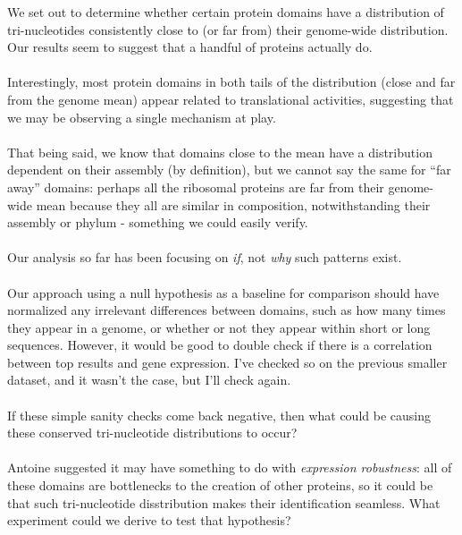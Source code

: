 \documentclass[12pt]{article}
\begin{document}
We set out to determine whether certain protein domains have a distribution of tri-nucleotides consistently close to (or far from) their genome-wide distribution. Our results seem to suggest that a handful of proteins actually do.\\
\\
Interestingly, most protein domains in both tails of the distribution (close and far from the genome mean) appear related to translational activities, suggesting that we may be observing a single mechanism at play.\\
\\
That being said, we know that domains close to the mean have a distribution dependent on their assembly (by definition), but we cannot say the same for ``far away'' domains: perhaps all the ribosomal proteins are far from their genome-wide mean because they all are similar in composition, notwithstanding their assembly or phylum - something we could easily verify.\\
\\
Our analysis so far has been focusing on \textit{if}, not \textit{why} such patterns exist.\\
\\
Our approach using a null hypothesis as a baseline for comparison should have normalized any irrelevant differences between domains, such as how many times they appear in a genome, or whether or not they appear within short or long sequences. However, it would be good to double check if there is a correlation between top results and gene expression. I've checked so on the previous smaller dataset, and it wasn't the case, but I'll check again.\\
\\
If these simple sanity checks come back negative, then what could be causing these conserved tri-nucleotide distributions to occur?\\
\\
Antoine suggested it may have something to do with \textit{expression robustness}: all of these domains are bottlenecks to the creation of other proteins, so it could be that such tri-nucleotide disstribution makes their identification seamless. What experiment could we derive to test that hypothesis?

\pagebreak



\end{document}
